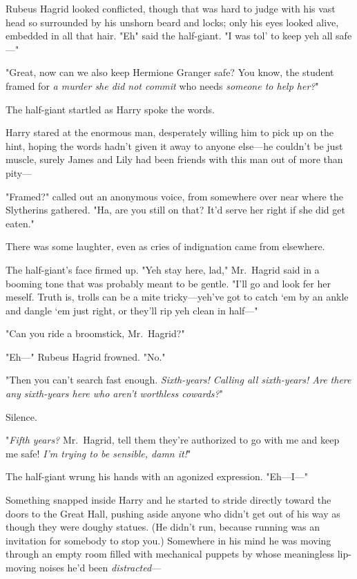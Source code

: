 Rubeus Hagrid looked conflicted, though that was hard to judge with his vast
head so surrounded by his unshorn beard and locks; only his eyes looked alive,
embedded in all that hair. "Eh{\el}" said the half-giant. "I was tol' to
keep yeh all safe—"

"Great, now can we also keep Hermione Granger safe? You know, the student
framed for \emph{a murder she did not commit} who needs \emph{someone to help
her?}"

The half-giant startled as Harry spoke the words.

Harry stared at the enormous man, desperately willing him to pick up on the
hint, hoping the words hadn't given it away to anyone else—he couldn't be
just muscle, surely James and Lily had been friends with this man out of more
than pity—

"Framed?" called out an anonymous voice, from somewhere over near where the
Slytherins gathered. "Ha, are you still on that? It'd serve her right if she
did get eaten."

There was some laughter, even as cries of indignation came from elsewhere.

The half-giant's face firmed up. "Yeh stay here, lad," Mr.~Hagrid said in a
booming tone that was probably meant to be gentle. "I'll go and look fer her
meself. Truth is, trolls can be a mite tricky—yeh've got to catch `em by an
ankle and dangle `em just right, or they'll rip yeh clean in half—"

"Can you ride a broomstick, Mr.~Hagrid?"

"Eh—" Rubeus Hagrid frowned. "No."

"Then you can't search fast enough. \emph{Sixth-years! Calling all sixth-years!
Are there any sixth-years here who aren't worthless cowards?}"

Silence.

"\emph{Fifth years?} Mr.~Hagrid, tell them they're authorized to go with me and
keep me safe! \emph{I'm trying to be sensible, damn it!}"

The half-giant wrung his hands with an agonized expression. "Eh—I—"

Something snapped inside Harry and he started to stride directly toward the
doors to the Great Hall, pushing aside anyone who didn't get out of his way as
though they were doughy statues. (He didn't run, because running was an
invitation for somebody to stop you.) Somewhere in his mind he was moving
through an empty room filled with mechanical puppets by whose meaningless
lip-moving noises he'd been \emph{distracted}—

